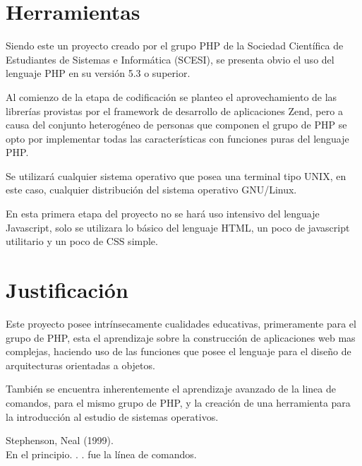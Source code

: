 \documentclass[letterpaper,11pt]{article}
\begin{document}
\section{Herramientas}
Siendo este un proyecto creado por el grupo PHP de la Sociedad Científica de
Estudiantes de Sistemas e Informática (SCESI), se presenta obvio el uso del
lenguaje PHP en su versión 5.3 o superior.

Al comienzo de la etapa de codificación se planteo el aprovechamiento de las
librerías provistas por el framework de desarrollo de aplicaciones Zend, pero
a causa del conjunto heterogéneo de personas que componen el grupo de PHP se
opto por implementar todas las características con funciones puras del
lenguaje PHP.

Se utilizará cualquier sistema operativo que posea una terminal tipo UNIX, en
este caso, cualquier distribución del sistema operativo GNU/Linux.

En esta primera etapa del proyecto no se hará uso intensivo del lenguaje
Javascript, solo se utilizara lo básico del lenguaje HTML, un poco de
javascript utilitario y un poco de CSS simple.

\section{Justificación}
Este proyecto posee intrínsecamente cualidades educativas, primeramente para
el grupo de PHP, esta el aprendizaje sobre la construcción de aplicaciones web
mas complejas, haciendo uso de las funciones que posee el lenguaje para el
diseño de arquitecturas orientadas a objetos.

También se encuentra inherentemente el aprendizaje avanzado de la linea de
comandos, para el mismo grupo de PHP, y la creación de una herramienta para la
introducción al estudio de sistemas operativos.

\begin{thebibliography}{99}

 Stephenson, Neal (1999).\\
En el principio. . . fue la línea de comandos.\\

\end{thebibliography}
\end{document}
